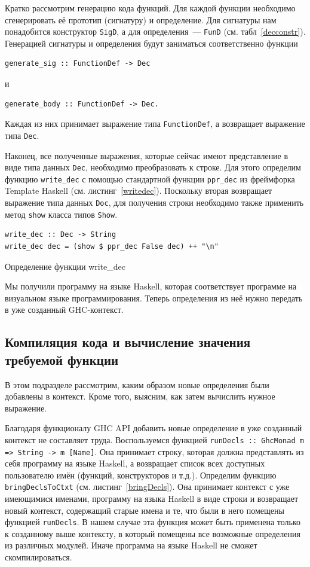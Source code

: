 		Кратко рассмотрим генерацию кода функций. Для каждой функции необходимо сгенерировать её прототип (сигнатуру) и определение. Для сигнатуры нам понадобится конструктор \lstinline!SigD!, а для определения~--- \lstinline!FunD! (см. табл~\ref{decconstr}). Генерацией сигнатуры и определения будут заниматься соответственно функции 
		\begin{lstlisting}
generate_sig :: FunctionDef -> Dec
		\end{lstlisting}
		и
		\begin{lstlisting}
generate_body :: FunctionDef -> Dec.
		\end{lstlisting}		
		Каждая из них принимает выражение типа \lstinline!FunctionDef!, а возвращает выражение типа \lstinline!Dec!.		

		Наконец, все полученные выражения, которые сейчас имеют представление в виде типа данных \lstinline!Dec!, необходимо преобразовать к строке. Для этого определим функцию \lstinline!write_dec! с помощью стандартной функции \lstinline!ppr_dec! из фреймфорка Template Haskell (см. листинг~\ref{writedec}). Поскольку вторая возвращает выражение типа данных \lstinline!Doc!, для получения строки необходимо также применить метод \lstinline!show! класса типов \lstinline!Show!.

\begin{ListingEnv}[h]
	\begin{lstlisting}
write_dec :: Dec -> String
write_dec dec = (show $ ppr_dec False dec) ++ "\n"
	\end{lstlisting}
	\caption{Определение функции write\_dec}\label{writedec}
\end{ListingEnv}		

		Мы получили программу на языке Haskell, которая соответствует программе на визуальном языке программирования. Теперь определения из неё нужно передать в уже созданный GHC-контекст.

	\subsection{Компиляция кода и вычисление значения требуемой функции}\label{basefuns}
		В этом подразделе рассмотрим, каким образом новые определения были добавлены в контекст. Кроме того, выясним, как затем вычислить нужное выражение.
		
		Благодаря функционалу GHC API добавить новые определение в уже созданный контекст не составляет труда. Воспользуемся функцией \lstinline!runDecls :: GhcMonad m => String -> m [Name]!. Она принимает строку, которая должна представлять из себя программу на языке Haskell, а возвращает список всех доступных пользователю имён (функций, конструкторов и т.д.). Определим функцию \lstinline!bringDeclsToCtxt! (см. листинг~\ref{bringDecls}). Она принимает контекст с уже имеющимися именами, программу на языка Haskell в виде строки и возвращает новый контекст, содержащий старые имена и те, что были в него помещены функцией \lstinline!runDecls!. В нашем случае эта функция может быть применена только к созданному выше контексту, в который помещены все возможные определения из различных модулей. Иначе программа на языке Haskell не сможет скомпилироваться.
		
